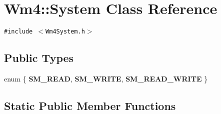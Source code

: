 \section{Wm4::System Class Reference}
\label{classWm4_1_1System}
{\tt \#include $<$Wm4System.h$>$}

\subsection*{Public Types}
\begin{CompactItemize}
\item 
enum \{ {\bf SM\_\-READ}, 
{\bf SM\_\-WRITE}, 
{\bf SM\_\-READ\_\-WRITE}
 \}
\end{CompactItemize}
\subsection*{Static Public Member Functions}
